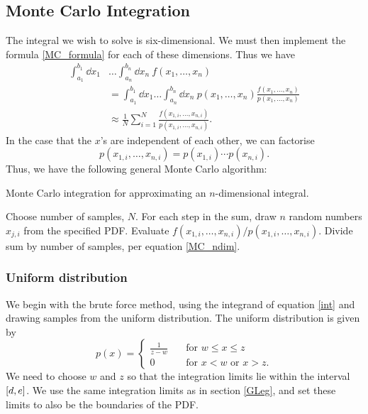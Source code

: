 \documentclass[notitlepage, reprint, nofootinbib]{revtex4-1}
\begin{document}
\subsection{Monte Carlo Integration}
The integral we wish to solve is six-dimensional. We must then implement the formula \ref{MC_formula} for each of these dimensions. Thus we have
\begin{align}
	\int_{a_1}^{b_1}\dd x_1 &\dots \int_{a_n}^{b_n} \dd x_n \ f(x_1, \ldots, x_n)\nonumber\\
	&=\int_{a_1}^{b_1}\dd x_1 \dots \int_{a_n}^{b_n} \dd x_n\ p(x_1,\ldots,x_n)\frac{f(x_1,\ldots, x_n)}{p(x_1,\ldots,x_n)}\nonumber\\
	&\approx \frac{1}{N} \sum_{i=1}^N \frac{f(x_{1,i},\ldots,x_{n,i})}{p(x_{1,i},\ldots,x_{n,i})}.\label{MC_ndim}
\end{align}
In the case that the $x$'s are independent of each other, we can factorise 
$$p(x_{1,i},\ldots, x_{n,i})=p(x_{1,i})\cdots p(x_{n,i}).$$
Thus, we have the following general Monte Carlo algorithm: 
\begin{algorithm}[H]
	\caption{Monte Carlo integration for approximating an $n$-dimensional integral.}
	\begin{algorithmic}[1]
		\State Choose number of samples, $N$.
		\State For each step in the sum, draw $n$ random numbers $x_{j,i}$ from the specified PDF.
		\State Evaluate $f(x_{1,i}, \ldots, x_{n,i})/p(x_{1,i},\ldots,x_{n,i})$.
		\State Divide sum by number of samples, per equation \ref{MC_ndim}.
	\end{algorithmic}
\end{algorithm}

\subsubsection{Uniform distribution}
We begin with the brute force method, using the integrand of equation \ref{int} and drawing samples from the uniform distribution. The uniform distribution is given by 
\begin{equation}\label{uni_dist}p(x)=\begin{cases} \frac{1}{z-w} \quad &\text{for $w \leq x \leq z$}\\ 0 \quad &\text{for $x < w$ or $x > z$.}\end{cases} \end{equation}
We need to choose $w$ and $z$ so that the integration limits lie within the interval $\qty[d, e]$. We use the same integration limits as in section \ref{GLeg}, and set these limits to also be the boundaries of the PDF. 
\end{document}
